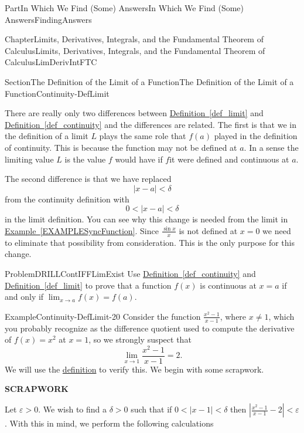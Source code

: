 \documentclass[oneside,10pt,]{book}
\newcommand{\xreffont}{\relax}
\newcommand{\terminology}[1]{\textbf{#1}}
\numberwithin{equation}{part}
\newcommand{\abs}[1]{\left|#1\right|}
\def\limit#1#2#3{{\displaystyle\lim_{#1\rightarrow #2}#3}}
\newcommand{\eps}{\varepsilon}
\newcommand{\lt}{<}
\begin{document}
\begin{partptx}{Part}{In Which We Find (Some) Answers}{}{In Which We Find (Some) Answers}{}{}{FindingAnswers}
\begin{chapterptx}{Chapter}{Limits, Derivatives, Integrals, and the Fundamental Theorem of Calculus}{}{Limits, Derivatives, Integrals, and the Fundamental Theorem of Calculus}{}{}{LimDerivIntFTC}
\begin{sectionptx}{Section}{The Definition of the Limit of a Function}{}{The Definition of the Limit of a Function}{}{}{Continuity-DefLimit}
\par
There are really only two differences between \hyperref[def_limit]{Definition~{\xreffont\ref{def_limit}}} and \hyperref[def_continuity]{Definition~{\xreffont\ref{def_continuity}}} and the differences are related.  The first is that we in the definition of a limit \(L\) plays the same role that \(f(a)\) played in the definition of continuity.  This is because the function may not be defined at \(a\).  In a sense the limiting value \(L\) is the value \(f\) would have if \(f\)it were defined and continuous at \(a\).%
\par
The second difference is that we have replaced%
\begin{equation*}
\abs{x-a}\lt
\delta 
\end{equation*}
from the continuity definition with%
\begin{equation*}
0\lt
\abs{x-a}\lt \delta 
\end{equation*}
in the limit definition. You can see why this change is needed from the limit in \hyperref[EXAMPLESyncFunction]{Example~{\xreffont\ref{EXAMPLESyncFunction}}}. Since \(\frac{\sin
x}{x}\) is not defined at \(x=0\) we need to eliminate that possibility from consideration.  This is the only purpose for this change.%
\begin{problem}{Problem}{}{DRILLContIFFLimExist}%
Use \hyperref[def_continuity]{Definition~{\xreffont\ref{def_continuity}}} and \hyperref[def_limit]{Definition~{\xreffont\ref{def_limit}}} to prove that a function \(f(x)\) is continuous at \(x=a\) if and only if \(\limit{x}{a}{f(x)}=f(a)\).%
\end{problem}
\begin{example}{Example}{}{Continuity-DefLimit-20}%
Consider the function \(\frac{x^2-1}{x-1}\), where \(x\neq 1\), which you probably recognize as the difference quotient used to compute the derivative of \(f(x)=x^2\) at \(x=1\), so we strongly suspect that%
\begin{equation*}
\limit{x}{1}{\frac{x^2-1}{x-1}}=2\text{.}
\end{equation*}
We will use the \hyperref[def_limit]{definition} to verify this. We begin with some scrapwork.%
\par
\terminology{SCRAPWORK}%
\par
Let \(\eps>0\).  We wish to find a \(\delta>0\) such that if \(0\lt \abs{x-1}\lt \delta\) then \(\abs{\frac{x^2-1}{x-1}-2}\lt \eps\).  With this in mind, we perform the following calculations%
\begin{equation*}

\end{equation*}
\end{example}
\end{sectionptx}
\end{chapterptx}
\end{partptx}
\end{document}
